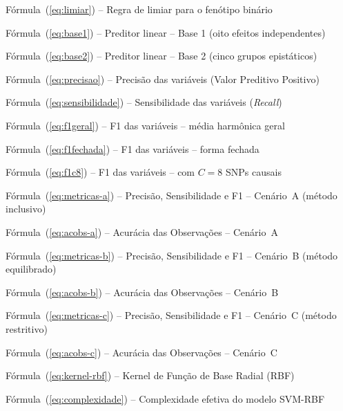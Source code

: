 \documentclass[
    12pt,
    a4paper,
    oneside,
    english,
    french,
    spanish,
    brazil
    ]{abntex2}
\begin{document}
\clearpage

\tableofcontents
\clearpage
\listoffigures
\clearpage

\begin{SingleSpace}
\setlength{\parskip}{0pt}
\par\noindent Fórmula~(\ref{eq:limiar}) -- Regra de limiar para o fenótipo binário \cftdotfill{\cftdotsep}\pageref{eq:limiar}
\par\noindent Fórmula~(\ref{eq:base1}) -- Preditor linear -- Base 1 (oito efeitos independentes) \cftdotfill{\cftdotsep}\pageref{eq:base1}
\par\noindent Fórmula~(\ref{eq:base2}) -- Preditor linear -- Base 2 (cinco grupos epistáticos) \cftdotfill{\cftdotsep}\pageref{eq:base2}
\par\noindent Fórmula~(\ref{eq:precisao}) -- Precisão das variáveis (Valor Preditivo Positivo) \cftdotfill{\cftdotsep}\pageref{eq:precisao}
\par\noindent Fórmula~(\ref{eq:sensibilidade}) -- Sensibilidade das variáveis (\textit{Recall}) \cftdotfill{\cftdotsep}\pageref{eq:sensibilidade}
\par\noindent Fórmula~(\ref{eq:f1geral}) -- F1 das variáveis -- média harmônica geral \cftdotfill{\cftdotsep}\pageref{eq:f1geral}
\par\noindent Fórmula~(\ref{eq:f1fechada}) -- F1 das variáveis -- forma fechada \cftdotfill{\cftdotsep}\pageref{eq:f1fechada}
\par\noindent Fórmula~(\ref{eq:f1c8}) -- F1 das variáveis -- com $C = 8$ SNPs causais \cftdotfill{\cftdotsep}\pageref{eq:f1c8}
\par\noindent Fórmula~(\ref{eq:metricas-a}) -- Precisão, Sensibilidade e F1 -- Cenário~A (método inclusivo) \cftdotfill{\cftdotsep}\pageref{eq:metricas-a}
\par\noindent Fórmula~(\ref{eq:acobs-a}) -- Acurácia das Observações -- Cenário~A \cftdotfill{\cftdotsep}\pageref{eq:acobs-a}
\par\noindent Fórmula~(\ref{eq:metricas-b}) -- Precisão, Sensibilidade e F1 -- Cenário~B (método equilibrado) \cftdotfill{\cftdotsep}\pageref{eq:metricas-b}
\par\noindent Fórmula~(\ref{eq:acobs-b}) -- Acurácia das Observações -- Cenário~B \cftdotfill{\cftdotsep}\pageref{eq:acobs-b}
\par\noindent Fórmula~(\ref{eq:metricas-c}) -- Precisão, Sensibilidade e F1 -- Cenário~C (método restritivo) \cftdotfill{\cftdotsep}\pageref{eq:metricas-c}
\par\noindent Fórmula~(\ref{eq:acobs-c}) -- Acurácia das Observações -- Cenário~C \cftdotfill{\cftdotsep}\pageref{eq:acobs-c}
\par\noindent Fórmula~(\ref{eq:kernel-rbf}) -- Kernel de Função de Base Radial (RBF) \cftdotfill{\cftdotsep}\pageref{eq:kernel-rbf}
\par\noindent Fórmula~(\ref{eq:complexidade}) -- Complexidade efetiva do modelo SVM-RBF \cftdotfill{\cftdotsep}\pageref{eq:complexidade}
\end{SingleSpace}
\clearpage
\end{document}
